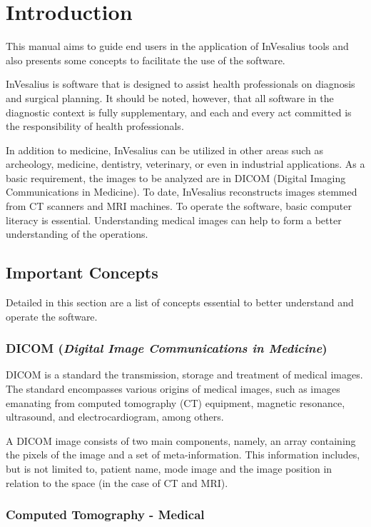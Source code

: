 \chapter{Introduction}

This manual aims to guide end users in the application of InVesalius tools and also presents some concepts to facilitate the use of the software.

InVesalius is software that is designed to assist health professionals on diagnosis and surgical planning. It should be noted, however, that all software in the diagnostic context is fully supplementary, and each and every act committed is the responsibility of health professionals.
 
In addition to medicine, InVesalius can be utilized in other areas such as archeology, medicine, dentistry, veterinary, or even in industrial applications. As a basic requirement, the images to be analyzed are in DICOM (Digital Imaging Communications in Medicine). To date, InVesalius reconstructs images stemmed from CT scanners and MRI machines. To operate the software, basic computer literacy is essential. Understanding medical images can help to form a better understanding of the operations.

\section{Important Concepts}

Detailed in this section are a list of concepts essential to better understand and operate the software.

\subsection{DICOM (\textit{Digital Image Communications in Medicine})}	

DICOM is a standard the transmission, storage and treatment of medical images. The standard encompasses various origins of medical images, such as images emanating from computed tomography (CT) equipment, magnetic resonance, ultrasound, and electrocardiogram, among others.

A DICOM image consists of two main components, namely, an array containing the pixels of the image and a set of meta-information. This information includes, but is not limited to, patient name, mode image and the image position in relation to the space (in the case of CT and MRI).

\subsection{Computed Tomography - Medical}

